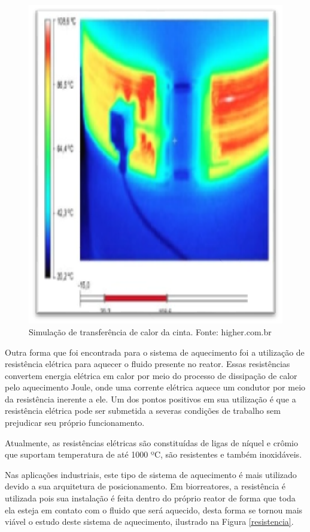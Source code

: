 \begin{figure}[h]
	\centering
	\includegraphics[keepaspectratio=true,scale=0.4]{figuras/cinta2.eps}
	\caption{Simulação de transferência de calor da cinta.
Fonte: higher.com.br}
	\label{cinta2}
\end{figure}

Outra forma que foi encontrada para o sistema de aquecimento foi a utilização de resistência elétrica para aquecer o fluido presente no reator. Essas resistências convertem energia elétrica em calor por meio do processo de dissipação de calor pelo aquecimento Joule, onde uma corrente elétrica aquece um condutor por meio da resistência inerente a ele. Um dos pontos positivos em sua utilização é que a resistência elétrica pode ser submetida a severas condições de trabalho sem prejudicar seu próprio funcionamento.

Atualmente, as resistências elétricas são constituídas de ligas de níquel e crômio que suportam temperatura de até 1000 ºC, são resistentes e também inoxidáveis.

Nas aplicações industriais, este tipo de sistema de aquecimento é mais utilizado devido a sua arquitetura de posicionamento. Em biorreatores, a resistência é utilizada pois sua instalação é feita dentro do próprio reator de forma que toda ela esteja em contato com o fluido que será aquecido, desta forma se tornou mais viável o estudo deste sistema de aquecimento, ilustrado na Figura \ref{resistencia}.

